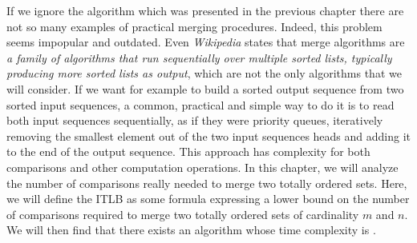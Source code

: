 \label{tree:merging:intro}

If we ignore the \mergesort algorithm which was presented in
the previous chapter there are not so many examples of practical merging
procedures. Indeed, this problem seems impopular and outdated. Even
\emph{Wikipedia} states that merge algorithms are \emph{a family of algorithms
that run sequentially over multiple sorted lists, typically producing more
sorted lists as output}, which are not the only algorithms that we will
consider. If we want for example to build a sorted output sequence from two
sorted input sequences, a common, practical and simple way to do it is to read
both input sequences sequentially, as if they were priority queues, iteratively
removing the smallest element out of the two input sequences heads and adding
it to the end of the output sequence. This approach has  complexity for
both comparisons and other computation operations. In this chapter, we will
analyze the number of comparisons really needed to merge two totally
ordered sets. Here, we will define the ITLB as some formula expressing a lower
bound on the number of comparisons required to merge two totally ordered sets
of cardinality $m$ and $n$. We will then find that there exists an algorithm
whose time complexity is .

